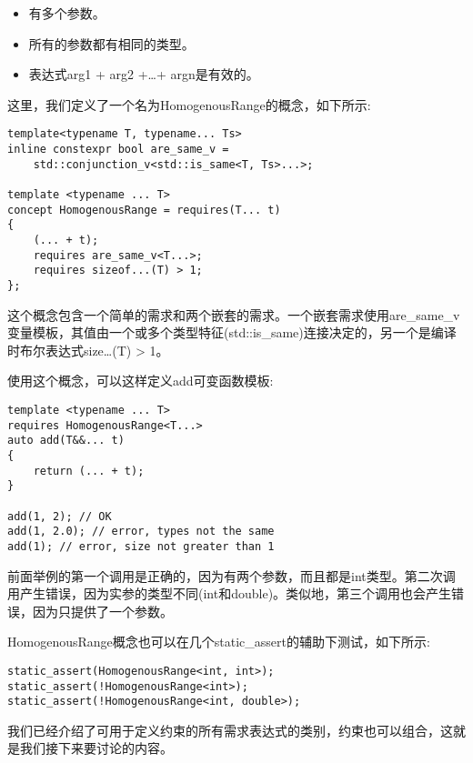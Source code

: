\begin{itemize}
\item
有多个参数。

\item
所有的参数都有相同的类型。

\item
表达式arg1 + arg2 +…+ argn是有效的。
\end{itemize}

这里，我们定义了一个名为HomogenousRange的概念，如下所示:

\begin{lstlisting}[style=styleCXX]
template<typename T, typename... Ts>
inline constexpr bool are_same_v =
	std::conjunction_v<std::is_same<T, Ts>...>;
	
template <typename ... T>
concept HomogenousRange = requires(T... t)
{
	(... + t);
	requires are_same_v<T...>;
	requires sizeof...(T) > 1;
};
\end{lstlisting}

这个概念包含一个简单的需求和两个嵌套的需求。一个嵌套需求使用are\_same\_v变量模板，其值由一个或多个类型特征(std::is\_same)连接决定的，另一个是编译时布尔表达式size…(T) > 1。

使用这个概念，可以这样定义add可变函数模板:

\begin{lstlisting}[style=styleCXX]
template <typename ... T>
requires HomogenousRange<T...>
auto add(T&&... t)
{
	return (... + t);
}

add(1, 2); // OK
add(1, 2.0); // error, types not the same
add(1); // error, size not greater than 1
\end{lstlisting}

前面举例的第一个调用是正确的，因为有两个参数，而且都是int类型。第二次调用产生错误，因为实参的类型不同(int和double)。类似地，第三个调用也会产生错误，因为只提供了一个参数。

HomogenousRange概念也可以在几个static\_assert的辅助下测试，如下所示:

\begin{lstlisting}[style=styleCXX]
static_assert(HomogenousRange<int, int>);
static_assert(!HomogenousRange<int>);
static_assert(!HomogenousRange<int, double>);
\end{lstlisting}

我们已经介绍了可用于定义约束的所有需求表达式的类别，约束也可以组合，这就是我们接下来要讨论的内容。
















